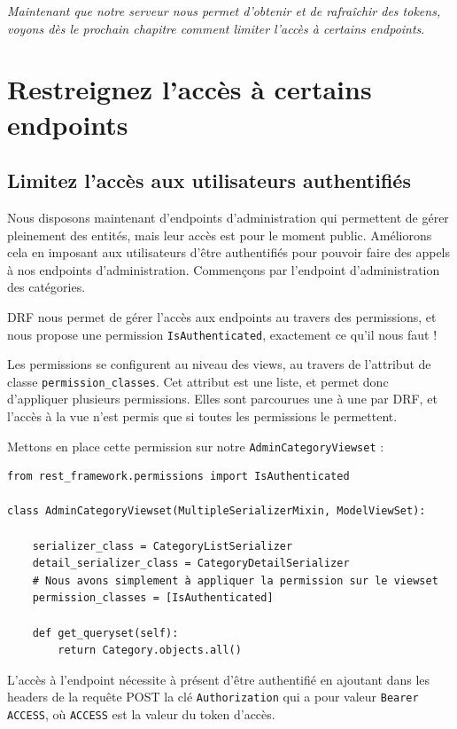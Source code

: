  {\em Maintenant que notre serveur nous permet d’obtenir et de rafraîchir des tokens, voyons dès le prochain chapitre comment limiter l’accès à certains endpoints}.

\section{Restreignez l'accès à certains endpoints}
\subsection{Limitez l’accès aux utilisateurs authentifiés}
Nous disposons maintenant d’endpoints d’administration qui permettent de gérer pleinement des entités, mais leur accès est pour le moment {\color{monOrange}public}. Améliorons cela en imposant aux utilisateurs d’être authentifiés pour pouvoir faire des appels à nos endpoints d’administration. Commençons par l'endpoint d’{\color{monOrange}administration des catégories}.

DRF nous permet de {\color{monOrange}gérer l’accès aux endpoints} au travers des permissions, et nous propose une permission {\tt IsAuthenticated}, exactement ce qu’il nous faut !

Les permissions se configurent au niveau des views, au travers de l’attribut de classe {\tt permission\_classes}. Cet attribut est une liste, et permet donc d’appliquer plusieurs permissions. Elles sont parcourues une à une par DRF, et l’accès à la vue n’est permis que si toutes les permissions le permettent.

Mettons en place cette permission sur notre {\tt AdminCategoryViewset}  :
\begin{verbatim}
from rest_framework.permissions import IsAuthenticated
 
class AdminCategoryViewset(MultipleSerializerMixin, ModelViewSet):
 
    serializer_class = CategoryListSerializer
    detail_serializer_class = CategoryDetailSerializer
    # Nous avons simplement à appliquer la permission sur le viewset
    permission_classes = [IsAuthenticated]
 
    def get_queryset(self):
        return Category.objects.all()
\end{verbatim}

L’accès à l'endpoint nécessite à présent d’être authentifié en ajoutant dans les headers de la requête POST la clé {\tt Authorization}  qui a pour valeur  {\tt Bearer ACCESS}, où {\tt ACCESS}  est la valeur du token d’accès.

